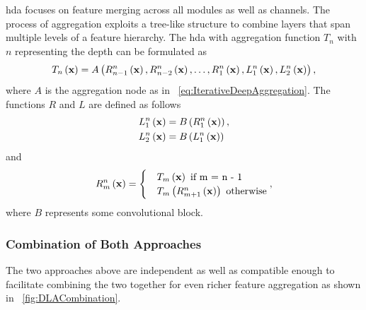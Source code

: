 \gls{hda} focuses on feature merging across all modules as well as channels. The process of aggregation exploits a tree-like structure to combine layers that span multiple levels of a feature hierarchy. The \gls{hda} with aggregation function $T_n$ with $n$ representing the depth can be formulated as
\begin{equation}
    \label{eq:HierarchicalDeepAggregation}
    {T_n} \left( \mathbf{x} \right) =
    {A} \left( 
        {{R}_{n - 1}^{n}} \left( \mathbf{x} \right),
        {{R}_{n - 2}^{n}} \left( \mathbf{x} \right),
        \dots,
        {{R}_{1}^{n}} \left( \mathbf{x} \right),
        {{L}_{1}^{n}} \left( \mathbf{x} \right),
        {{L}_{2}^{n}} \left( \mathbf{x} \right)
     \right),
\end{equation}
where $A$ is the aggregation node as in \eqtext{}~\ref{eq:IterativeDeepAggregation}. The functions $R$ and $L$ are defined as follows
\begin{equation}
    \label{eq:HDAConvBlocksL}
    \begin{aligned}
         & {{L}_{1}^{n}} \left( \mathbf{x} \right) = {B} \left( {{R}_{1}^{n}} \left( \mathbf{x} \right) \right), \\
         & {{L}_{2}^{n}} \left( \mathbf{x} \right) = {B} \left( {{L}_{1}^{n}} \left( \mathbf{x} \right) \right)
    \end{aligned}
\end{equation}
and
\begin{equation}
    \label{eq:DLAConvBlocksR}
    \func{\subsup{R}{m}{n}}{\vect{x}} =
    \begin{cases}
         & \func{T_m}{\vect{x}} \text{ if } $m = n - 1$                        \\
         & \func{T_m}{\func{\subsup{R}{m + 1}{n}}{\vect{x}}} \text{ otherwise}
    \end{cases},
\end{equation}
where $B$ represents some convolutional block.

\subsubsection{Combination of Both Approaches}

The two approaches above are independent as well as compatible enough to facilitate combining the two together for even richer feature aggregation as shown in \figtext{}~\ref{fig:DLACombination}.

